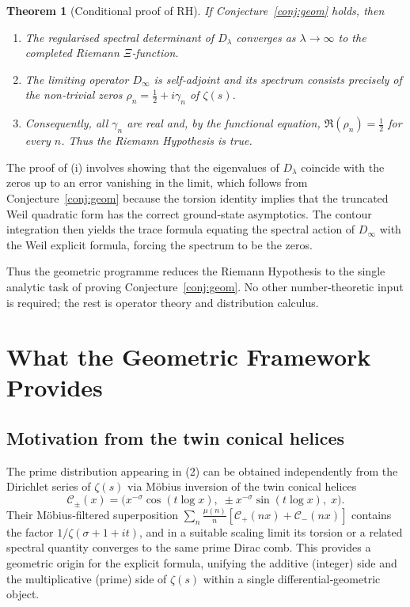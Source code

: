 \documentclass[12pt,a4paper]{article}
\newtheorem{theorem}{Theorem}[section]
\begin{document}
\begin{theorem}[Conditional proof of RH]\label{thm:conditional}
If Conjecture~\ref{conj:geom} holds, then
\begin{enumerate}
\item The regularised spectral determinant of $D_\lambda$ converges as $\lambda\to\infty$ to the completed Riemann $\Xi$‑function.
\item The limiting operator $D_\infty$ is self‑adjoint and its spectrum consists precisely of the non‑trivial zeros $\rho_n = \frac12 + i\gamma_n$ of $\zeta(s)$.
\item Consequently, all $\gamma_n$ are real and, by the functional equation, $\Re(\rho_n)=\frac12$ for every $n$.  Thus the Riemann Hypothesis is true.
\end{enumerate}
\end{theorem}
The proof of (i) involves showing that the eigenvalues of $D_\lambda$ coincide with the zeros up to an error vanishing in the limit, which follows from Conjecture~\ref{conj:geom} because the torsion identity implies that the truncated Weil quadratic form has the correct ground‑state asymptotics.  The contour integration then yields the trace formula equating the spectral action of $D_\infty$ with the Weil explicit formula, forcing the spectrum to be the zeros.

Thus the geometric programme reduces the Riemann Hypothesis to the single analytic task of proving Conjecture~\ref{conj:geom}.  No other number‑theoretic input is required; the rest is operator theory and distribution calculus.

\section{What the Geometric Framework Provides}

\subsection{Motivation from the twin conical helices}
The prime distribution appearing in (2) can be obtained independently from the Dirichlet series of $\zeta(s)$ via M\"obius inversion of the twin conical helices
\[
\mathcal{C}_\pm(x) = \bigl( x^{-\sigma}\cos(t\log x),\; \pm x^{-\sigma}\sin(t\log x),\; x \bigr) .
\]
Their M\"obius‑filtered superposition $\sum_n \frac{\mu(n)}{n}[\mathcal{C}_+(nx)+\mathcal{C}_-(nx)]$ contains the factor $1/\zeta(\sigma+1+it)$, and in a suitable scaling limit its torsion or a related spectral quantity converges to the same prime Dirac comb.  This provides a geometric origin for the explicit formula, unifying the additive (integer) side and the multiplicative (prime) side of $\zeta(s)$ within a single differential‑geometric object.
\end{document}
